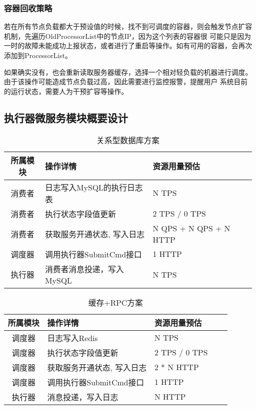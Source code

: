 \subsubsection{容器回收策略}
若在所有节点负载都大于预设值的时候，找不到可调度的容器，则会触发节点扩容机制，先遍历OldProcessorList中的节点IP，因为这个列表的容器很
可能只是因为一时的故障未能成功上报状态，或者进行了重启等操作。如有可用的容器，会再次添加到ProcessorList\cite{lamprecht2021reinforcement}。

如果确实没有，也会重新读取服务器缓存，选择一个相对轻负载的机器进行调度。由于该操作可能造成节点负载过高，因此需要进行监控报警，提醒用户
系统目前的运行状态，需要人为干预扩容等操作。


\subsection{执行器微服务模块概要设计}

\begin{table}[H]
    \centering
    \caption{关系型数据库方案}
    \label{tab:old_design}
    \begin{tabular}{cll}
        \toprule
        所属模块    &操作详情   &资源用量预估 \\
        \midrule
        消费者 & 日志写入MySQL的执行日志表 & N TPS \\
        消费者 & 执行状态字段值更新 & 2 TPS / 0 TPS \\
        消费者 & 获取服务开通状态, 写入日志 & N QPS + N QPS + N HTTP \\
        调度器 & 调用执行器SubmitCmd接口 & 1 HTTP \\
        执行器 & 消费者消息投递，写入MySQL & N TPS \\
        \bottomrule
    \end{tabular}
\end{table}



\begin{table}[H]
    \centering
    \caption{缓存+RPC方案}
    \label{tab:new_design}
    \begin{tabular}{cllll}
        \toprule
        所属模块	&操作详情	&资源用量预估 \\
        \midrule
        调度器 & 日志写入Redis & N TPS \\
        调度器 & 执行状态字段值更新 & 2 TPS / 0 TPS \\
        调度器 & 获取服务开通状态, 写入日志 & 2 * N HTTP \\
        调度器 & 调用执行器SubmitCmd接口 & 1 HTTP \\
        执行器 & 消息投递，写入日志 & N HTTP \\
        \bottomrule
    \end{tabular}
\end{table}

